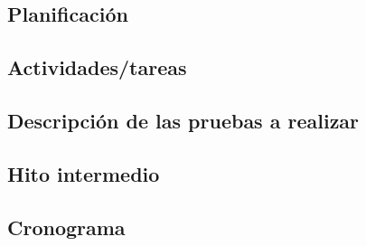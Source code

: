 \documentclass[a4paper,12pt]{article}
\begin{document}
\begin{linenumbers}
  \section{Planificación}
  \label{sec:Planificación}
      \subsection{Actividades/tareas}
      \label{sec:Actividades}
      \subsection{Descripción de las pruebas a realizar}
      \label{sec:Descripción de las pruebas a realizar}
      \subsection{Hito intermedio}
      \label{sec:Hito intermedio}
      \subsection{Cronograma}
      \label{sec:Cronograma}
 

  \newpage
  



  


  

  
  \renewcommand{\refname}{Bibliograf\'ia}
  
  



\end{linenumbers} %
\end{document}

